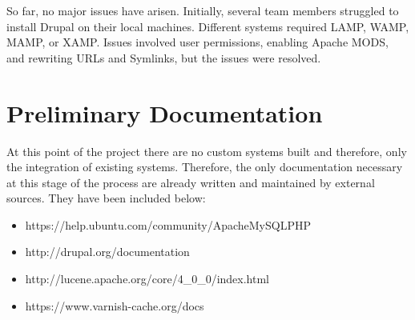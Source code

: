 \documentclass[12pt]{article} %
\begin{document}
So far, no major issues have arisen. Initially, several team members struggled to install Drupal on their local machines. Different systems required LAMP, WAMP, MAMP, or XAMP. Issues involved user permissions, enabling Apache MODS, and rewriting URLs and Symlinks, but the issues were resolved.

\section{Preliminary Documentation}

At this point of the project there are no custom systems built and therefore, only the integration of existing systems. Therefore, the only documentation necessary at this stage of the process are already written and maintained by external sources. They have been included below:

\begin{itemize}
\item https://help.ubuntu.com/community/ApacheMySQLPHP
\item http://drupal.org/documentation
\item http://lucene.apache.org/core/4\_0\_0/index.html
\item https://www.varnish-cache.org/docs
\end{itemize}
\end{document}
